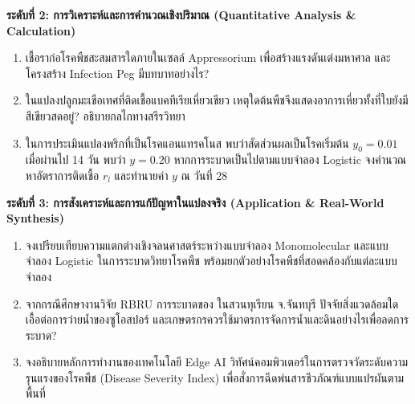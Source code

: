 \noindent \textbf{ระดับที่ 2: การวิเคราะห์และการคำนวณเชิงปริมาณ (Quantitative Analysis \& Calculation)}
\begin{enumerate}[resume]
    \item เชื้อราก่อโรคพืชสะสมสารใดภายในเซลล์ Appressorium เพื่อสร้างแรงดันเต่งมหาศาล และโครงสร้าง Infection Peg มีบทบาทอย่างไร?
    \item ในแปลงปลูกมะเขือเทศที่ติดเชื้อแบคทีเรียเหี่ยวเขียว  เหตุใดต้นพืชจึงแสดงอาการเหี่ยวทั้งที่ใบยังมีสีเขียวสดอยู่? อธิบายกลไกทางสรีรวิทยา
    \item ในการประเมินแปลงพริกที่เป็นโรคแอนแทรคโนส พบว่าสัดส่วนผลเป็นโรคเริ่มต้น $y_0 = 0.01$ เมื่อผ่านไป 14 วัน พบว่า $y = 0.20$ หากการระบาดเป็นไปตามแบบจำลอง Logistic จงคำนวณหาอัตราการติดเชื้อ $r_l$ และทำนายค่า $y$ ณ วันที่ 28
\end{enumerate}

\noindent \textbf{ระดับที่ 3: การสังเคราะห์และการแก้ปัญหาในแปลงจริง (Application \& Real-World Synthesis)}
\begin{enumerate}[resume]
    \item จงเปรียบเทียบความแตกต่างเชิงจลนศาสตร์ระหว่างแบบจำลอง Monomolecular และแบบจำลอง Logistic ในการระบาดวิทยาโรคพืช พร้อมยกตัวอย่างโรคพืชที่สอดคล้องกับแต่ละแบบจำลอง
    \item จากกรณีศึกษางานวิจัย RBRU การระบาดของ  ในสวนทุเรียน จ.จันทบุรี ปัจจัยสิ่งแวดล้อมใดเอื้อต่อการว่ายน้ำของซูโอสปอร์ และเกษตรกรควรใช้มาตรการจัดการน้ำและดินอย่างไรเพื่อลดการระบาด?
    \item จงอธิบายหลักการทำงานของเทคโนโลยี Edge AI วิทัศน์คอมพิวเตอร์ในการตรวจวัดระดับความรุนแรงของโรคพืช (Disease Severity Index) เพื่อสั่งการฉีดพ่นสารชีวภัณฑ์แบบแปรผันตามพื้นที่
\end{enumerate}
